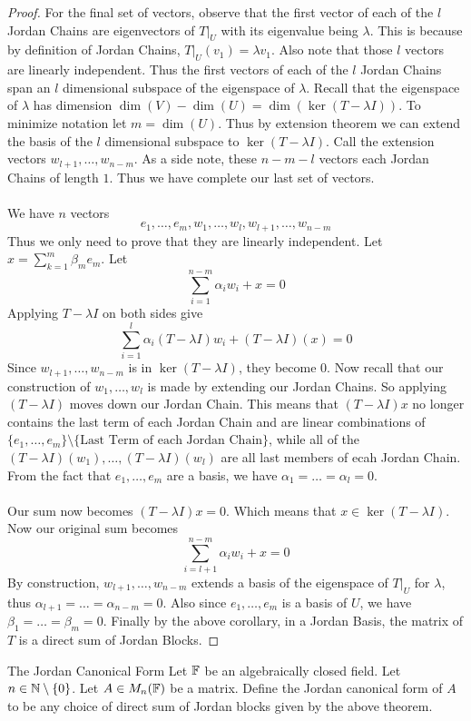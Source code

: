 \documentclass[a4paper]{article}
\begin{document}
\begin{thm}{}{}
\begin{proof}
For the final set of vectors, observe that the first vector of each of the $l$ Jordan Chains are eigenvectors of $T|_U$ with its eigenvalue being $\lambda$. This is because by definition of Jordan Chains, $T|_U(v_1)=\lambda v_1$. Also note that those $l$ vectors are linearly independent. Thus the first vectors of each of the $l$ Jordan Chains span an $l$ dimensional subspace of the eigenspace of $\lambda$. Recall that the eigenspace of $\lambda$ has dimension $\dim(V)-\dim(U)=\dim(\ker(T-\lambda I))$. To minimize notation let $m=\dim(U)$. Thus by extension theorem we can extend the basis of the $l$ dimensional subspace to $\ker(T-\lambda I)$. Call the extension vectors $w_{l+1},\dots,w_{n-m}$. As a side note, these $n-m-l$ vectors each Jordan Chains of length $1$. Thus we have complete our last set of vectors. \\~\\
We have $n$ vectors $$e_1,\dots,e_m,w_1,\dots,w_l,w_{l+1},\dots,w_{n-m}$$ Thus we only need to prove that they are linearly independent. Let $x=\sum_{k=1}^m\beta_me_m$. Let $$\sum_{i=1}^{n-m}\alpha_iw_i+x=0$$ Applying $T-\lambda I$ on both sides give $$\sum_{i=1}^{l}\alpha_i(T-\lambda I)w_i+(T-\lambda I)(x)=0$$ Since $w_{l+1},\dots,w_{n-m}$ is in $\ker(T-\lambda I)$, they become $0$. Now recall that our construction of $w_1,\dots,w_l$ is made by extending our Jordan Chains. So applying $(T-\lambda I)$ moves down our Jordan Chain. This means that $(T-\lambda I)x$ no longer contains the last term of each Jordan Chain and are linear combinations of $\{e_1,\dots,e_m\}\setminus\{\text{Last Term of each Jordan Chain}\}$, while all of the $(T-\lambda I)(w_1),\dots,(T-\lambda I)(w_l)$ are all last members of ecah Jordan Chain. From the fact that $e_1,\dots,e_m$ are a basis, we have $\alpha_1=\dots=\alpha_l=0$. \\~\\
Our sum now becomes $(T-\lambda I)x=0$. Which means that $x\in\ker(T-\lambda I)$. Now our original sum becomes $$\sum_{i=l+1}^{n-m}\alpha_iw_i+x=0$$ By construction, $w_{l+1},\dots,w_{n-m}$ extends a basis of the eigenspace of $T|_U$ for $\lambda$, thus $\alpha_{l+1}=\dots=\alpha_{n-m}=0$. Also since $e_1,\dots,e_m$ is a basis of $U$, we have $\beta_1=\dots=\beta_m=0$. 
Finally by the above corollary, in a Jordan Basis, the matrix of $T$ is a direct sum of Jordan Blocks. 
\end{proof}
\end{thm}

\begin{defn}{The Jordan Canonical Form}{} Let $\mathbb{F}$ be an algebraically closed field. Let $n\in\mathbb{N}\setminus\{0\}$. Let $A\in M_n(\mathbb{F})$ be a matrix. Define the Jordan canonical form of $A$ to be any choice of direct sum of Jordan blocks given by the above theorem. 
\end{defn}
\end{document}
